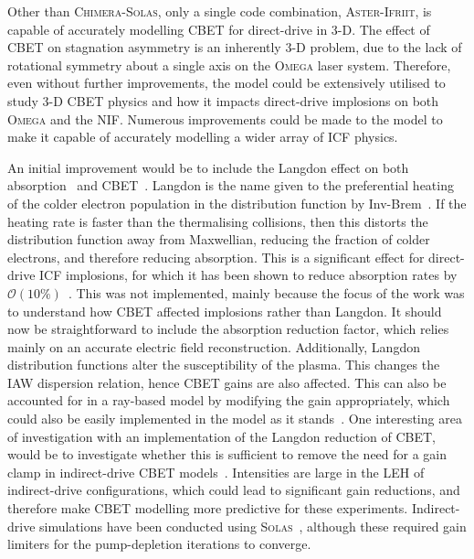Other than \textsc{Chimera}-\textsc{Solas}, only a single code combination, \textsc{Aster}-\textsc{Ifriit}, is capable of accurately modelling \ac{CBET} for direct-drive in 3-D.
The effect of \ac{CBET} on stagnation asymmetry is an inherently 3-D problem, due to the lack of rotational symmetry about a single axis on the \textsc{Omega} laser system.
Therefore, even without further improvements, the model could be extensively utilised to study 3-D \ac{CBET} physics and how it impacts direct-drive implosions on both \textsc{Omega} and the \ac{NIF}.
Numerous improvements could be made to the model to make it capable of accurately modelling a wider array of \ac{ICF} physics.

An initial improvement would be to include the Langdon effect on both absorption~\cite{turnbull_inverse_2023} and \ac{CBET}~\cite{turnbull_impact_2020}.
Langdon is the name given to the preferential heating of the colder electron population in the distribution function by \ac{Inv-Brem}~\cite{langdon_nonlinear_1980}.
If the heating rate is faster than the thermalising collisions, then this distorts the distribution function away from Maxwellian, reducing the fraction of colder electrons, and therefore reducing absorption.
This is a significant effect for direct-drive \ac{ICF} implosions, for which it has been shown to reduce absorption rates by $\mathcal{O}(10\%)$~\cite{turnbull_inverse_2023}.
This was not implemented, mainly because the focus of the work was to understand how \ac{CBET} affected implosions rather than Langdon.
It should now be straightforward to include the absorption reduction factor, which relies mainly on an accurate electric field reconstruction.
Additionally, Langdon distribution functions alter the susceptibility of the plasma.
This changes the \ac{IAW} dispersion relation, hence \ac{CBET} gains are also affected.
This can also be accounted for in a ray-based model by modifying the gain appropriately, which could also be easily implemented in the model as it stands~\cite{turnbull_impact_2020}.
One interesting area of investigation with an implementation of the Langdon reduction of \ac{CBET}, would be to investigate whether this is sufficient to remove the need for a gain clamp in indirect-drive \ac{CBET} models~\cite{michel_tuning_2009}.
Intensities are large in the \ac{LEH} of indirect-drive configurations, which could lead to significant gain reductions, and therefore make \ac{CBET} modelling more predictive for these experiments.
Indirect-drive simulations have been conducted using \textsc{Solas}~\cite{chittenden_crossbeam_2024}, although these required gain limiters for the pump-depletion iterations to converge.

